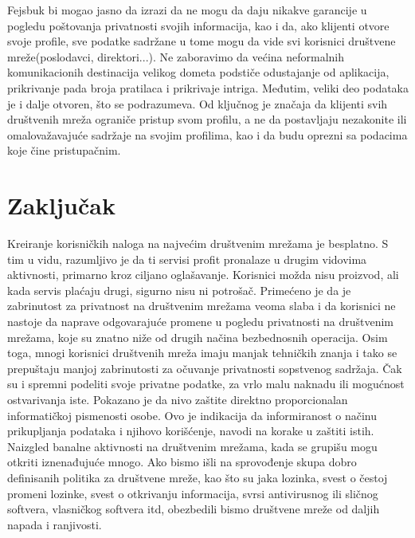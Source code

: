 \documentclass[a4paper]{article}
\begin{document}
Fejsbuk bi mogao jasno   da izrazi da ne mogu   da daju nikakve  garancije u  pogledu poštovanja privatnosti svojih  informacija, kao i da, ako klijenti otvore svoje profile, sve podatke sadržane u tome mogu da vide svi korisnici društvene mreže(poslodavci, direktori...).
Ne zaboravimo da  većina neformalnih komunikacionih destinacija velikog dometa
podstiče odustajanje od aplikacija, prikrivanje pada broja pratilaca i prikrivaje intriga. Međutim, veliki deo podataka je i dalje otvoren, što se podrazumeva. Od ključnog je značaja da klijenti svih društvenih mreža ograniče pristup svom profilu, a ne da postavljaju nezakonite ili omalovažavajuće sadržaje na svojim profilima, kao i da budu oprezni sa podacima koje čine pristupačnim.

\newpage
 




\section{Zaključak}
\large
Kreiranje korisničkih naloga na najvećim društvenim mrežama je besplatno. S tim u vidu, razumljivo je da ti servisi profit pronalaze u drugim vidovima aktivnosti, primarno kroz ciljano oglašavanje. Korisnici možda nisu proizvod, ali kada servis plaćaju drugi, sigurno nisu ni potrošač. Primećeno je da je zabrinutost za privatnost na društvenim mrežama veoma slaba i da korisnici ne nastoje da naprave odgovarajuće promene u pogledu privatnosti na društvenim mrežama, koje su znatno niže od drugih načina bezbednosnih operacija. Osim toga, mnogi korisnici društvenih mreža imaju manjak tehničkih znanja i tako se prepuštaju manjoj zabrinutosti za očuvanje privatnosti sopstvenog sadržaja. Čak su i spremni podeliti svoje privatne podatke, za vrlo malu naknadu ili mogućnost ostvarivanja iste. Pokazano je da nivo zaštite direktno proporcionalan informatičkoj pismenosti osobe. Ovo je indikacija da informiranost o načinu prikupljanja podataka i njihovo korišćenje, navodi na korake u zaštiti istih. Naizgled banalne aktivnosti na društvenim mrežama, kada se grupišu mogu otkriti iznenađujuće mnogo. Ako bismo išli na sprovođenje skupa dobro definisanih politika za društvene mreže, kao što su jaka lozinka, svest o čestoj promeni  lozinke, svest o otkrivanju informacija, svrsi  antivirusnog ili  sličnog softvera,  vlasničkog softvera itd, obezbedili bismo društvene mreže od daljih napada i ranjivosti.
\newpage


\appendix
\end{document}

